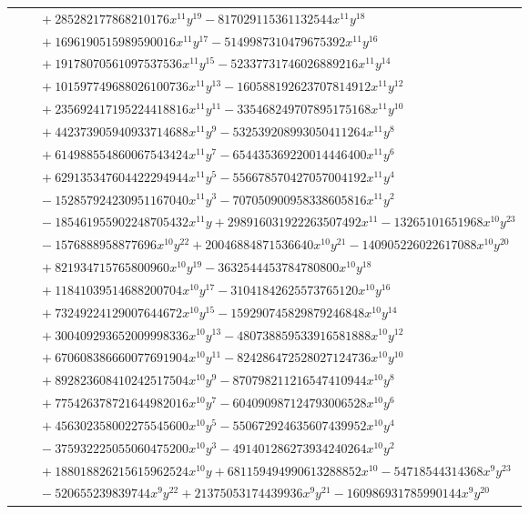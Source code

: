 \documentclass[11pt]{article}
\begin{document}
\begin{longtable}{@{}ll@{}}
 & $\quad +285282177868210176x^{11}y^{19}-817029115361132544x^{11}y^{18}$\\
 & $\quad +1696190515989590016x^{11}y^{17}-5149987310479675392x^{11}y^{16}$\\
 & $\quad +19178070561097537536x^{11}y^{15}-52337731746026889216x^{11}y^{14}$\\
 & $\quad +101597749688026100736x^{11}y^{13}-160588192623707814912x^{11}y^{12}$\\
 & $\quad +235692417195224418816x^{11}y^{11}-335468249707895175168x^{11}y^{10}$\\
 & $\quad +442373905940933714688x^{11}y^{9}-532539208993050411264x^{11}y^{8}$\\
 & $\quad +614988554860067543424x^{11}y^{7}-654435369220014446400x^{11}y^{6}$\\
 & $\quad +629135347604422294944x^{11}y^{5}-556678570427057004192x^{11}y^{4}$\\
 & $\quad -152857924230951167040x^{11}y^{3}-707050900958338605816x^{11}y^{2}$\\
 & $\quad -185461955902248705432x^{11}y+298916031922263507492x^{11}-13265101651968x^{10}y^{23}$\\
 & $\quad -1576888958877696x^{10}y^{22}+20046884871536640x^{10}y^{21}-140905226022617088x^{10}y^{20}$\\
 & $\quad +821934715765800960x^{10}y^{19}-3632544453784780800x^{10}y^{18}$\\
 & $\quad +11841039514688200704x^{10}y^{17}-31041842625573765120x^{10}y^{16}$\\
 & $\quad +73249224129007644672x^{10}y^{15}-159290745829879246848x^{10}y^{14}$\\
 & $\quad +300409293652009998336x^{10}y^{13}-480738859533916581888x^{10}y^{12}$\\
 & $\quad +670608386660077691904x^{10}y^{11}-824286472528027124736x^{10}y^{10}$\\
 & $\quad +892823608410242517504x^{10}y^{9}-870798211216547410944x^{10}y^{8}$\\
 & $\quad +775426378721644982016x^{10}y^{7}-604090987124793006528x^{10}y^{6}$\\
 & $\quad +456302358002275545600x^{10}y^{5}-550672924635607439952x^{10}y^{4}$\\
 & $\quad -375932225055060475200x^{10}y^{3}-491401286273934240264x^{10}y^{2}$\\
 & $\quad +188018826215615962524x^{10}y+681159494990613288852x^{10}-54718544314368x^{9}y^{23}$\\
 & $\quad -520655239839744x^{9}y^{22}+21375053174439936x^{9}y^{21}-160986931785990144x^{9}y^{20}$\\

\end{longtable}
\end{document}
